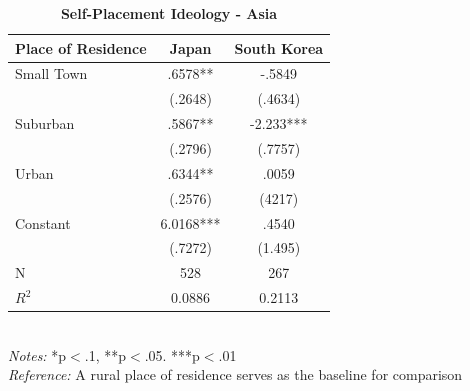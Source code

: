 \documentclass[12pt, titlepage]{article}
\newcommand\e{\emph}
\newcommand\tb{\textbf}
\begin{document}
\begin{singlespace}
	\begin{table}[H]
		\centering 
		\caption{\tb{Self-Placement Ideology - Asia}}
		\begin{tabulary}{\linewidth}{l c c}
			\\
			\hline
			\tb{Place of Residence} & \tb{Japan} & \tb{South Korea}\\
			\hline
			Small Town &.6578** & -.5849 \\
			&(.2648) & (.4634)\\
			Suburban&.5867** & -2.233*** \\
			& (.2796) & (.7757)\\
			Urban & .6344** &.0059 \\
			& (.2576) & (4217)\\
			Constant& 6.0168*** & .4540 \\
			& (.7272) & (1.495)\\
			N&528 & 267\\
			$R^2$&0.0886 & 0.2113\\
			\hline
		\end{tabulary}
		\\
		\e{Notes:} *p$<$.1, **p$<$.05. ***p$<$.01 \\
		\e{Reference:} A rural place of residence serves as the baseline for comparison
		\label{table12}
	\end{table}
\end{singlespace}
\end{document}
